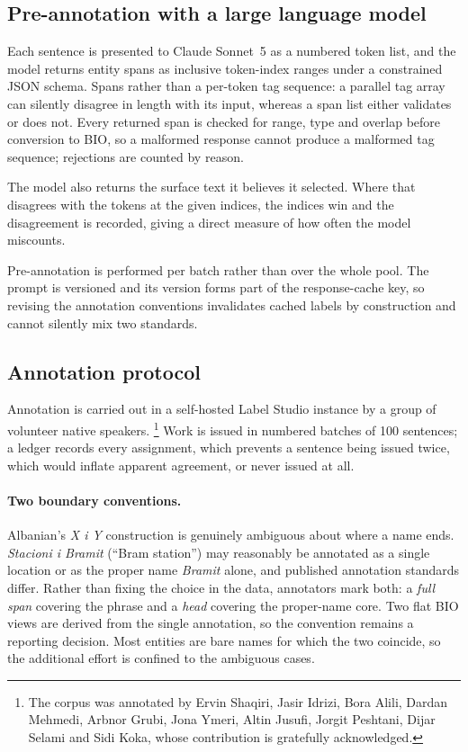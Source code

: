 \subsection{Pre-annotation with a large language model}
\label{sec:method:prelabel}

Each sentence is presented to Claude Sonnet~5 as a numbered token list, and the model returns entity spans as inclusive token-index ranges under a constrained JSON schema. Spans rather than a per-token tag sequence: a parallel tag array can silently disagree in length with its input, whereas a span list either validates or does not. Every returned span is checked for range, type and overlap before conversion to BIO, so a malformed response cannot produce a malformed tag sequence; rejections are counted by reason.

The model also returns the surface text it believes it selected. Where that disagrees with the tokens at the given indices, the indices win and the disagreement is recorded, giving a direct measure of how often the model miscounts.

Pre-annotation is performed per batch rather than over the whole pool. The prompt is versioned and its version forms part of the response-cache key, so revising the annotation conventions invalidates cached labels by construction and cannot silently mix two standards.

\subsection{Annotation protocol}
\label{sec:method:annotation}

Annotation is carried out in a self-hosted Label Studio instance by a group of
volunteer native speakers.%
\footnote{
The corpus was annotated by Ervin Shaqiri, Jasir Idrizi, Bora Alili, Dardan Mehmedi, Arbnor Grubi, Jona Ymeri, Altin Jusufi, Jorgit Peshtani, Dijar Selami and Sidi Koka, whose contribution is gratefully acknowledged.}
Work is issued in numbered batches of 100 sentences; a ledger records every assignment, which prevents a sentence being issued twice, which would inflate apparent agreement, or never issued at all.

\paragraph{Two boundary conventions.}
Albanian's \emph{X i Y} construction is genuinely ambiguous about where a name ends. \emph{Stacioni i Bramit} (``Bram station'') may reasonably be annotated as a single location or as the proper name \emph{Bramit} alone, and published annotation standards differ. Rather than fixing the choice in the data, annotators mark both: a \emph{full span} covering the phrase and a \emph{head} covering the proper-name core. Two flat BIO views are derived from the single annotation, so the convention remains a reporting decision. Most entities are bare names for which the two coincide, so the additional effort is confined to the ambiguous cases.

